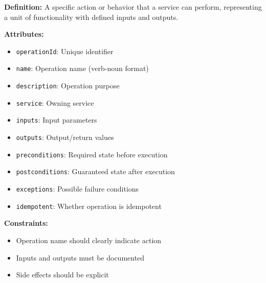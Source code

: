 \documentclass[11pt,letterpaper]{article}
\begin{document}
\begin{definitionbox}
\textbf{Definition:} A specific action or behavior that a service can perform, representing a unit of functionality with defined inputs and outputs.

\textbf{Attributes:}
\begin{itemize}[nosep]
    \item \texttt{operationId}: Unique identifier
    \item \texttt{name}: Operation name (verb-noun format)
    \item \texttt{description}: Operation purpose
    \item \texttt{service}: Owning service
    \item \texttt{inputs}: Input parameters
    \item \texttt{outputs}: Output/return values
    \item \texttt{preconditions}: Required state before execution
    \item \texttt{postconditions}: Guaranteed state after execution
    \item \texttt{exceptions}: Possible failure conditions
    \item \texttt{idempotent}: Whether operation is idempotent
\end{itemize}

\textbf{Constraints:}
\begin{itemize}[nosep]
    \item Operation name should clearly indicate action
    \item Inputs and outputs must be documented
    \item Side effects should be explicit
\end{itemize}
\end{definitionbox}
\end{document}
